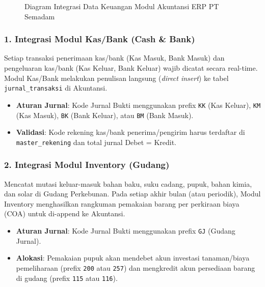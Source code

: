 \documentclass[11pt,a4paper]{article}
\begin{document}
\begin{figure}[h!]
\caption{Diagram Integrasi Data Keuangan Modul Akuntansi ERP PT Semadam}
\label{fig:integrasi_modul}
\end{figure}

\subsubsection{1. Integrasi Modul Kas/Bank (Cash \& Bank)}
Setiap transaksi penerimaan kas/bank (Kas Masuk, Bank Masuk) dan pengeluaran kas/bank (Kas Keluar, Bank Keluar) wajib dicatat secara real-time. Modul Kas/Bank melakukan penulisan langsung (\textit{direct insert}) ke tabel \texttt{jurnal\_transaksi} di Akuntansi.
\begin{itemize}
    \item \textbf{Aturan Jurnal}: Kode Jurnal Bukti menggunakan prefix \texttt{KK} (Kas Keluar), \texttt{KM} (Kas Masuk), \texttt{BK} (Bank Keluar), atau \texttt{BM} (Bank Masuk).
    \item \textbf{Validasi}: Kode rekening kas/bank penerima/pengirim harus terdaftar di \texttt{master\_rekening} dan total jurnal Debet = Kredit.
\end{itemize}

\subsubsection{2. Integrasi Modul Inventory (Gudang)}
Mencatat mutasi keluar-masuk bahan baku, suku cadang, pupuk, bahan kimia, dan solar di Gudang Perkebunan. Pada setiap akhir bulan (atau periodik), Modul Inventory menghasilkan rangkuman pemakaian barang per perkiraan biaya (COA) untuk di-append ke Akuntansi.
\begin{itemize}
    \item \textbf{Aturan Jurnal}: Kode Jurnal Bukti menggunakan prefix \texttt{GJ} (Gudang Jurnal).
    \item \textbf{Alokasi}: Pemakaian pupuk akan mendebet akun investasi tanaman/biaya pemeliharaan (prefix \texttt{200} atau \texttt{257}) dan mengkredit akun persediaan barang di gudang (prefix \texttt{115} atau \texttt{116}).
\end{itemize}
\end{document}

